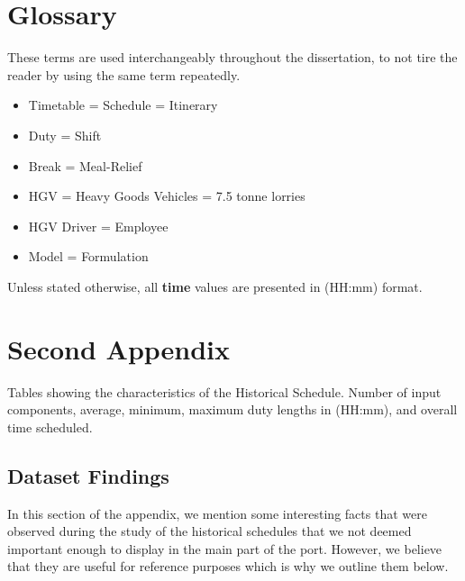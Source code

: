 \appendix
\chapter{Glossary}

These terms are used interchangeably throughout the dissertation, to not tire the reader by using the same term repeatedly.

\begin{itemize}
    \item Timetable = Schedule = Itinerary
    \item Duty = Shift 
    \item Break = Meal-Relief
    \item HGV = Heavy Goods Vehicles = 7.5 tonne lorries
    \item HGV Driver = Employee
    \item Model = Formulation 
\end{itemize}

\vspace{\baselineskip}
\noindent
Unless stated otherwise, all \textbf{time} values are presented in (HH:mm) format. 
 

\chapter{Second Appendix}
\label{chapter: second appendix}
Tables showing the characteristics of the Historical Schedule. Number of input components, average, minimum, maximum duty lengths in (HH:mm), and overall time scheduled.


\section{Dataset Findings}
In this section of the appendix, we mention some interesting facts that were observed during the study of the historical schedules that we not deemed important enough to display in the main part of the port. However, we believe that they are useful for reference purposes which is why we outline them below. 


